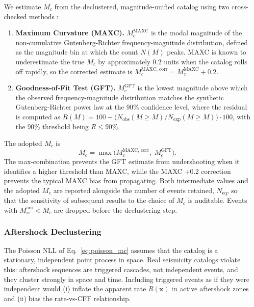 \documentclass[11pt, a4paper]{article}
\begin{document}
We estimate $M_c$ from the declustered, magnitude-unified catalog using two cross-checked methods \cite{Wiemer2000}:
\begin{enumerate}
    \item \textbf{Maximum Curvature (MAXC).} $M_c^{\text{MAXC}}$ is the modal magnitude of the non-cumulative Gutenberg-Richter frequency-magnitude distribution, defined as the magnitude bin at which the count $N(M)$ peaks. MAXC is known to underestimate the true $M_c$ by approximately $0.2$ units when the catalog rolls off rapidly, so the corrected estimate is $M_c^{\text{MAXC, corr}} = M_c^{\text{MAXC}} + 0.2$.
    \item \textbf{Goodness-of-Fit Test (GFT).} $M_c^{\text{GFT}}$ is the lowest magnitude above which the observed frequency-magnitude distribution matches the synthetic Gutenberg-Richter power law at the 90\% confidence level, where the residual is computed as $R(M) = 100 - \bigl(N_{\text{obs}}(M \ge M) / N_{\text{exp}}(M \ge M)\bigr) \cdot 100$, with the 90\% threshold being $R \le 90\%$.
\end{enumerate}
The adopted $M_c$ is
\begin{equation}
    M_c = \max\bigl(M_c^{\text{MAXC, corr}},\; M_c^{\text{GFT}}\bigr).
    \label{eq:mc_def}
\end{equation}
The max-combination prevents the GFT estimate from undershooting when it identifies a higher threshold than MAXC, while the MAXC $+0.2$ correction prevents the typical MAXC bias from propagating. Both intermediate values and the adopted $M_c$ are reported alongside the number of events retained, $N_{\text{eq}}$, so that the sensitivity of subsequent results to the choice of $M_c$ is auditable. Events with $M_w^{\text{uni}} < M_c$ are dropped before the declustering step.

\subsubsection{Aftershock Declustering}
\label{sec:decluster}
The Poisson NLL of Eq.~\ref{eq:poisson_mc} assumes that the catalog is a stationary, independent point process in space. Real seismicity catalogs violate this: aftershock sequences are triggered cascades, not independent events, and they cluster strongly in space and time. Including triggered events as if they were independent would (i) inflate the apparent rate $R(\mathbf{x})$ in active aftershock zones and (ii) bias the rate-vs-CFF relationship.
\end{document}
